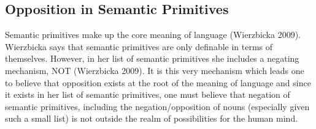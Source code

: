 \subsection {Opposition in Semantic Primitives} Semantic primitives make up the core meaning of language (Wierzbicka 2009).  Wierzbicka says that semantic primitives are only definable in terms of themselves.  However, in her list of semantic primitives she includes a negating mechanism, NOT (Wierzbicka 2009).  It is this very mechanism which leads one to believe that opposition exists at the root of the meaning of language and since it exists in her list of semantic primitives, one must believe that negation of semantic primitives, including the negation/opposition of nouns (especially given such a small list) is not outside the realm of possibilities for the human mind. 

